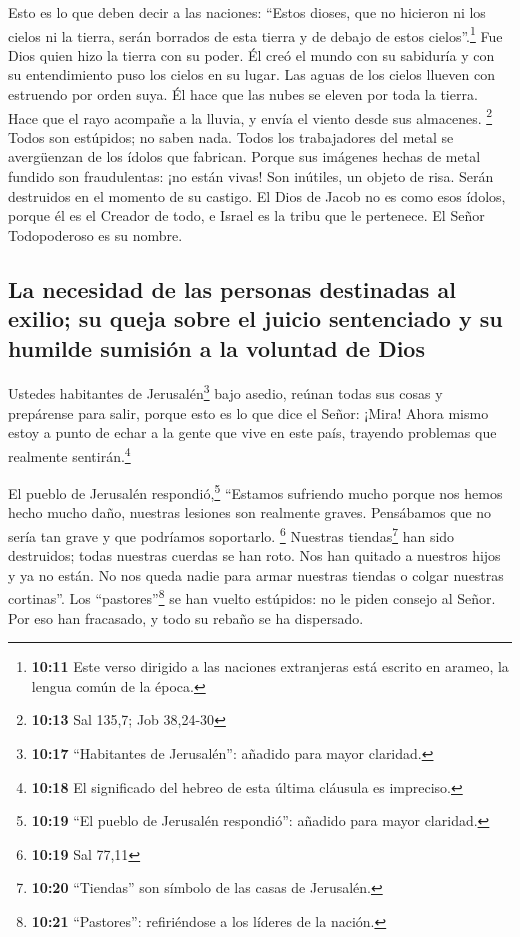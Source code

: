  Esto es lo que deben decir a las naciones: ``Estos
dioses, que no hicieron ni los cielos ni la tierra, serán borrados de
esta tierra y de debajo de estos cielos''.\footnote{\textbf{10:11} Este
  verso dirigido a las naciones extranjeras está escrito en arameo, la
  lengua común de la época.}  Fue Dios quien hizo la
tierra con su poder. Él creó el mundo con su sabiduría y con su
entendimiento puso los cielos en su lugar.  Las aguas de
los cielos llueven con estruendo por orden suya. Él hace que las nubes
se eleven por toda la tierra. Hace que el rayo acompañe a la lluvia, y
envía el viento desde sus almacenes. \footnote{\textbf{10:13} Sal 135,7;
  Job 38,24-30}  Todos son estúpidos; no saben nada.
Todos los trabajadores del metal se avergüenzan de los ídolos que
fabrican. Porque sus imágenes hechas de metal fundido son fraudulentas:
¡no están vivas!  Son inútiles, un objeto de risa. Serán
destruidos en el momento de su castigo.  El Dios de Jacob
no es como esos ídolos, porque él es el Creador de todo, e Israel es la
tribu que le pertenece. El Señor Todopoderoso es su nombre.

\hypertarget{la-necesidad-de-las-personas-destinadas-al-exilio-su-queja-sobre-el-juicio-sentenciado-y-su-humilde-sumisiuxf3n-a-la-voluntad-de-dios}{%
\subsection{La necesidad de las personas destinadas al exilio; su queja
sobre el juicio sentenciado y su humilde sumisión a la voluntad de
Dios}\label{la-necesidad-de-las-personas-destinadas-al-exilio-su-queja-sobre-el-juicio-sentenciado-y-su-humilde-sumisiuxf3n-a-la-voluntad-de-dios}}

 Ustedes habitantes de Jerusalén\footnote{\textbf{10:17}
  ``Habitantes de Jerusalén'': añadido para mayor claridad.} bajo
asedio, reúnan todas sus cosas y prepárense para salir, 
porque esto es lo que dice el Señor: ¡Mira! Ahora mismo estoy a punto de
echar a la gente que vive en este país, trayendo problemas que realmente
sentirán.\footnote{\textbf{10:18} El significado del hebreo de esta
  última cláusula es impreciso.}

 El pueblo de Jerusalén respondió,\footnote{\textbf{10:19}
  ``El pueblo de Jerusalén respondió'': añadido para mayor claridad.}
``Estamos sufriendo mucho porque nos hemos hecho mucho daño, nuestras
lesiones son realmente graves. Pensábamos que no sería tan grave y que
podríamos soportarlo. \footnote{\textbf{10:19} Sal 77,11}
 Nuestras tiendas\footnote{\textbf{10:20} ``Tiendas'' son
  símbolo de las casas de Jerusalén.} han sido destruidos; todas
nuestras cuerdas se han roto. Nos han quitado a nuestros hijos y ya no
están. No nos queda nadie para armar nuestras tiendas o colgar nuestras
cortinas''.  Los ``pastores''\footnote{\textbf{10:21}
  ``Pastores'': refiriéndose a los líderes de la nación.} se han vuelto
estúpidos: no le piden consejo al Señor. Por eso han fracasado, y todo
su rebaño se ha dispersado.

